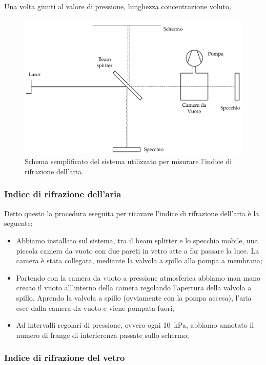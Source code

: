 Una volta giunti al valore di pressione, lunghezza concentrazione voluto,


\begin{figure}
    \centering
    \includegraphics[width=120mm]{drawing.pdf}
    \caption{Schema semplificato del sistema utilizzato per misurare l'indice di rifrazione dell'aria.}
    \label{fig:mik}
\end{figure}

\subsubsection{Indice di rifrazione dell'aria}

Detto questo la procedura eseguita per ricavare l'indice di rifrazione dell'aria è la seguente:

\begin{itemize}
	\item{Abbiamo installato sul sistema, tra il beam splitter e lo specchio mobile, una piccola camera da vuoto con due pareti in vetro atte a far passare la luce. La camera è stata collegata, mediante la valvola a spillo alla pompa a membrana;}
    \item{Partendo con la camera da vuoto a pressione atmosferica abbiamo man mano creato il vuoto all'interno della camera regolando l'apertura della valvola a spillo. Aprendo la valvola a spillo (ovviamente con la pompa accesa), l'aria esce dalla camera da vuoto e viene pompata fuori;}
    \item{Ad intervalli regolari di pressione, ovvero ogni \SI{10}{\kilo\pascal}, abbiamo annotato il numero di frange di interferenza passate sullo schermo;}
\end{itemize}

\subsubsection{Indice di rifrazione del vetro}

